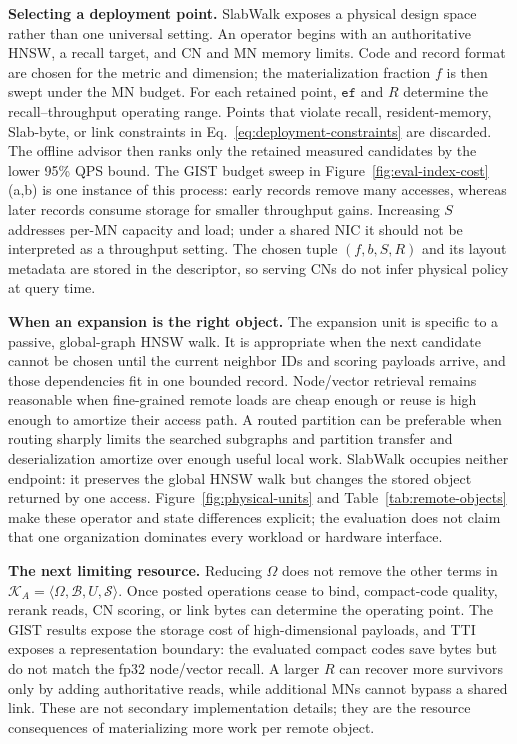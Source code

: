 \documentclass[sigconf,nonacm]{acmart}
\newcommand{\ef}{\texttt{ef}}
\begin{document}
\textbf{Selecting a deployment point.}
SlabWalk exposes a physical design space rather than one universal setting.
An operator begins with an authoritative HNSW, a recall target, and CN and MN
memory limits.  Code and record format are chosen for the metric and dimension;
the materialization fraction $f$ is then swept under the MN budget.  For each
retained point, $\ef$ and $R$ determine the recall--throughput operating range.
Points that violate recall, resident-memory, Slab-byte, or link constraints in
Eq.~\ref{eq:deployment-constraints} are discarded.  The offline advisor then
ranks only the retained measured candidates by the lower 95\% QPS bound.  The
GIST budget sweep in Figure~\ref{fig:eval-index-cost}(a,b) is one instance of
this process:
early records remove many accesses, whereas later records consume storage for
smaller throughput gains.  Increasing $S$ addresses per-MN capacity and load;
under a shared NIC it should not be interpreted as a throughput setting.  The
chosen tuple $(f,b,S,R)$ and its layout metadata are stored in the descriptor,
so serving CNs do not infer physical policy at query time.

\textbf{When an expansion is the right object.}
The expansion unit is specific to a passive, global-graph HNSW walk.  It is
appropriate when the next candidate cannot be chosen until the current
neighbor IDs and scoring payloads arrive, and those dependencies fit in one
bounded record.  Node/vector retrieval remains reasonable when fine-grained
remote loads are cheap enough or reuse is high enough to amortize their access
path.  A routed partition can be preferable when routing sharply limits the
searched subgraphs and partition transfer and deserialization amortize over
enough useful local work.  SlabWalk occupies neither endpoint: it preserves
the global HNSW walk but changes the stored object returned by one access.
Figure~\ref{fig:physical-units} and Table~\ref{tab:remote-objects} make these
operator and state differences explicit; the evaluation does not claim that
one organization dominates every workload or hardware interface.

\textbf{The next limiting resource.}
Reducing $\Omega$ does not remove the other terms in
$\mathcal{K}_A=\langle\Omega,\mathcal{B},U,\mathcal{S}\rangle$.  Once posted
operations cease to bind, compact-code quality, rerank reads, CN scoring, or
link bytes can determine the operating point.  The GIST results expose the
storage cost of high-dimensional payloads, and TTI exposes a representation
boundary: the evaluated compact codes save bytes but do not match the fp32
node/vector recall.  A larger $R$ can recover more survivors only by adding
authoritative reads, while additional MNs cannot bypass a shared link.  These
are not secondary implementation details; they are the resource consequences
of materializing more work per remote object.
\end{document}
